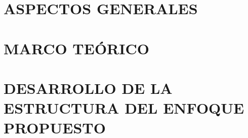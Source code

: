 \documentclass[12pt,oneside,a4paper]{book}
\theoremstyle{definition}
\renewcommand{\chaptermark}[1]{\markboth{\MakeUppercase{#1}}{}}
\begin{document}
\tableofcontents    %

\renewcommand\listtablename{ÍNDICE DE TABLAS}
\renewcommand\listfigurename{ÍNDICE DE FIGURAS}
\listoftables
\listoffigures

\mainmatter

\fancyhead[RE,LO]{\thesection}

\onehalfspacing            %


\part{ASPECTOS GENERALES}


\part{MARCO TEÓRICO}




\part{DESARROLLO DE LA ESTRUCTURA DEL ENFOQUE PROPUESTO}
  







\renewcommand\bibname{BIBLIOGRAFÍA}
\backmatter \singlespacing   %

\renewcommand{\appendixname}{Anexo}
\renewcommand{\appendixtocname}{ANEXOS}
\renewcommand{\appendixpagename}{ANEXOS}
\renewcommand{\chaptermark}[1]{\markboth{\MakeUppercase{\appendixname\ \thechapter}} {\MakeUppercase{#1}} }
\fancyhead[RE,LO]{}
\appendix
\clearpage
\addappheadtotoc
\appendixpage


\end{document}
